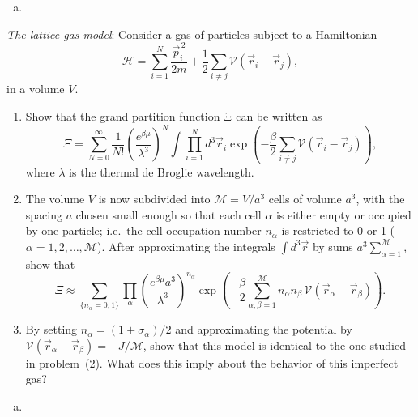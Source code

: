 \begin{solution}
    \begin{enumerate}[(a)]
        \item
    \end{enumerate}
\end{solution}

\begin{problem}
    \textit{The lattice-gas model}: Consider a gas of particles subject to a Hamiltonian
    \[
        \mathcal{H} = \sum_{i=1}^{N}\frac{\vec{p}_i^{\,2}}{2m} + \frac{1}{2}\sum_{i\neq j} \mathcal{V}(\vec{r}_i - \vec{r}_j),
    \]
    in a volume $V$.

    \begin{enumerate}
        \item[(a)] Show that the grand partition function $\Xi$ can be written as
        \[
            \Xi = \sum_{N=0}^{\infty}\frac{1}{N!}\left(\frac{e^{\beta\mu}}{\lambda^3}\right)^N \int \prod_{i=1}^{N} d^3\vec{r}_i \exp\!\left(-\frac{\beta}{2}\sum_{i\neq j}\mathcal{V}(\vec{r}_i - \vec{r}_j)\right),
        \]
        where $\lambda$ is the thermal de Broglie wavelength.

        \item[(b)] The volume $V$ is now subdivided into $\mathcal{M} = V/a^3$ cells of volume $a^3$, with the spacing $a$ chosen small enough so that each cell $\alpha$ is either empty or occupied by one particle; i.e.\ the cell occupation number $n_\alpha$ is restricted to 0 or 1 ($\alpha = 1, 2, \ldots, \mathcal{M}$). After approximating the integrals $\int d^3\vec{r}$ by sums $a^3\sum_{\alpha=1}^{\mathcal{M}}$, show that
        \[
            \Xi \approx \sum_{\{n_\alpha = 0,1\}} \prod_\alpha \left(\frac{e^{\beta\mu} a^3}{\lambda^3}\right)^{n_\alpha} \exp\!\left(-\frac{\beta}{2}\sum_{\alpha,\beta=1}^{\mathcal{M}} n_\alpha n_\beta\, \mathcal{V}(\vec{r}_\alpha - \vec{r}_\beta)\right).
        \]

        \item[(c)] By setting $n_\alpha = (1 + \sigma_\alpha)/2$ and approximating the potential by $\mathcal{V}(\vec{r}_\alpha - \vec{r}_\beta) = -J/\mathcal{M}$, show that this model is identical to the one studied in problem~(2). What does this imply about the behavior of this imperfect gas?
    \end{enumerate}
\end{problem}

\begin{solution}
    \begin{enumerate}[(a)]
        \item
    \end{enumerate}
\end{solution}

